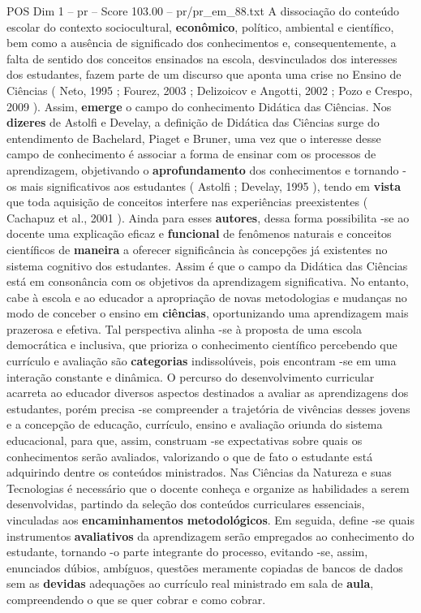 \begin{textsample}{POS Dim 1 – pr – Score 103.00 – pr/pr\_em\_88.txt}
A dissociação do conteúdo escolar do contexto sociocultural, \textbf{econômico}, político, ambiental e científico, bem como a ausência de significado dos conhecimentos e, consequentemente, a falta de sentido dos conceitos ensinados na escola, desvinculados dos interesses dos estudantes, fazem parte de um discurso que aponta uma crise no Ensino de Ciências ( Neto, 1995 ; Fourez, 2003 ; Delizoicov e Angotti, 2002 ; Pozo e Crespo, 2009 ).
Assim, \textbf{emerge} o campo do conhecimento Didática das Ciências.
Nos \textbf{dizeres} de Astolfi e Develay, a definição de Didática das Ciências surge do entendimento de Bachelard, Piaget e Bruner, uma vez que o interesse desse campo de conhecimento é associar a forma de ensinar com os processos de aprendizagem, objetivando o \textbf{aprofundamento} dos conhecimentos e tornando -os mais significativos aos estudantes ( Astolfi ; Develay, 1995 ), tendo em \textbf{vista} que toda aquisição de conceitos interfere nas experiências preexistentes ( Cachapuz et al., 2001 ).
Ainda para esses \textbf{autores}, dessa forma possibilita -se ao docente uma explicação eficaz e \textbf{funcional} de fenômenos naturais e conceitos científicos de \textbf{maneira} a oferecer significância às concepções já existentes no sistema cognitivo dos estudantes.
Assim é que o campo da Didática das Ciências está em consonância com os objetivos da aprendizagem significativa.
No entanto, cabe à escola e ao educador a apropriação de novas metodologias e mudanças no modo de conceber o ensino em \textbf{ciências}, oportunizando uma aprendizagem mais prazerosa e efetiva.
Tal perspectiva alinha -se à proposta de uma escola democrática e inclusiva, que prioriza o conhecimento científico percebendo que currículo e avaliação são \textbf{categorias} indissolúveis, pois encontram -se em uma interação constante e dinâmica.
O percurso do desenvolvimento curricular acarreta ao educador diversos aspectos destinados a avaliar as aprendizagens dos estudantes, porém precisa -se compreender a trajetória de vivências desses jovens e a concepção de educação, currículo, ensino e avaliação oriunda do sistema educacional, para que, assim, construam -se expectativas sobre quais os conhecimentos serão avaliados, valorizando o que de fato o estudante está adquirindo dentre os conteúdos ministrados.
Nas Ciências da Natureza e suas Tecnologias é necessário que o docente conheça e organize as habilidades a serem desenvolvidas, partindo da seleção dos conteúdos curriculares essenciais, vinculadas aos \textbf{encaminhamentos} \textbf{metodológicos}.
Em seguida, define -se quais instrumentos \textbf{avaliativos} da aprendizagem serão empregados ao conhecimento do estudante, tornando -o parte integrante do processo, evitando -se, assim, enunciados dúbios, ambíguos, questões meramente copiadas de bancos de dados sem as \textbf{devidas} adequações ao currículo real ministrado em sala de \textbf{aula}, compreendendo o que se quer cobrar e como cobrar.

\end{textsample}
